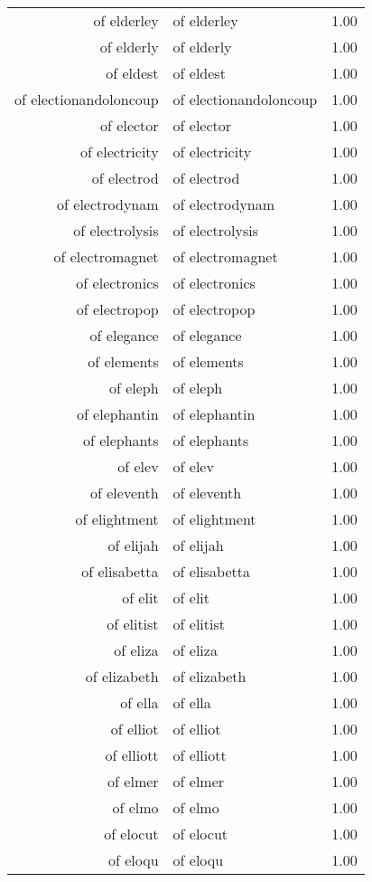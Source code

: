 \begin{table}[ht]
\begin{tabular}{rlr}
  of elderley & of elderley & 1.00 \\ 
  of elderly & of elderly & 1.00 \\ 
  of eldest & of eldest & 1.00 \\ 
  of electionandoloncoup & of electionandoloncoup & 1.00 \\ 
  of elector & of elector & 1.00 \\ 
  of electricity & of electricity & 1.00 \\ 
  of electrod & of electrod & 1.00 \\ 
  of electrodynam & of electrodynam & 1.00 \\ 
  of electrolysis & of electrolysis & 1.00 \\ 
  of electromagnet & of electromagnet & 1.00 \\ 
  of electronics & of electronics & 1.00 \\ 
  of electropop & of electropop & 1.00 \\ 
  of elegance & of elegance & 1.00 \\ 
  of elements & of elements & 1.00 \\ 
  of eleph & of eleph & 1.00 \\ 
  of elephantin & of elephantin & 1.00 \\ 
  of elephants & of elephants & 1.00 \\ 
  of elev & of elev & 1.00 \\ 
  of eleventh & of eleventh & 1.00 \\ 
  of elightment & of elightment & 1.00 \\ 
  of elijah & of elijah & 1.00 \\ 
  of elisabetta & of elisabetta & 1.00 \\ 
  of elit & of elit & 1.00 \\ 
  of elitist & of elitist & 1.00 \\ 
  of eliza & of eliza & 1.00 \\ 
  of elizabeth & of elizabeth & 1.00 \\ 
  of ella & of ella & 1.00 \\ 
  of elliot & of elliot & 1.00 \\ 
  of elliott & of elliott & 1.00 \\ 
  of elmer & of elmer & 1.00 \\ 
  of elmo & of elmo & 1.00 \\ 
  of elocut & of elocut & 1.00 \\ 
  of eloqu & of eloqu & 1.00 \\ 

\end{tabular}
\end{table}
